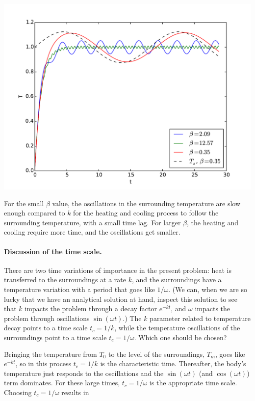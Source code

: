 \documentclass[graybox,envcountchap,sectrefs,final]{svmonodo}
\begin{document}
\centerline{\includegraphics[width=0.8\linewidth]{fig-scaling/osc_cooling.pdf}}



For the small $\beta$ value, the oscillations in the surrounding
temperature are slow enough compared to $k$ for the heating and
cooling process to follow the surrounding temperature, with a small
time lag. For larger $\beta$, the heating and cooling require more
time, and the oscillations get smaller.

\paragraph{Discussion of the time scale.}
There are two time variations of importance in the present problem:
heat is transferred to the surroundings at a rate $k$, and the
surroundings have a temperature variation with a period that goes like
$1/\omega$. (We can, when we are so lucky that we have an analytical
solution at hand, inspect this solution to see that $k$ impacts the
problem through a decay factor $e^{-kt}$, and $\omega$ impacts the problem
through oscillations $\sin(\omega t)$.)  The $k$ parameter related to
temperature decay points to a time scale $t_c=1/k$, while the
temperature oscillations of the surroundings point to a time scale
$t_c=1/\omega$.  Which one should be chosen?

Bringing the temperature from $T_0$ to the level of the surroundings,
$T_m$, goes like $e^{-kt}$, so in this process $t_c=1/k$ is the
characteristic time. Thereafter, the body's temperature just responds
to the oscillations and the $\sin (\omega t)$ (and $\cos(\omega t)$)
term dominates. For these large times, $t_c=1/\omega$ is the
appropriate time scale. Choosing $t_c=1/\omega$ results in
\end{document}
